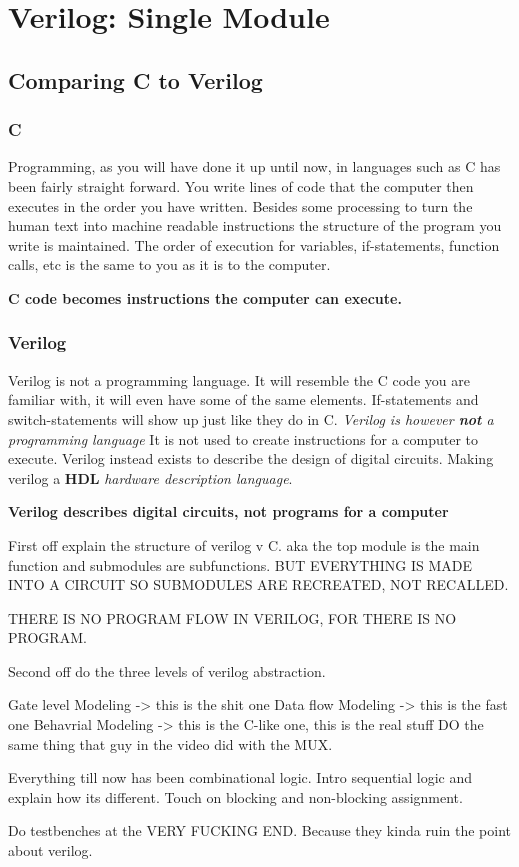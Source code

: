 \documentclass[12pt, a4paper, oneside]{memoir}
\newcommand{\attention}[1]{\begin{center}\colorbox{attention}{\textbf{#1}}\end{center}}
\begin{document}
\chapter{Verilog: Single Module} 
\section{Comparing C to Verilog}
\subsection*{C}
Programming, as you will have done it up until now, in languages such as C has been fairly straight forward.
You write lines of code that the computer then executes in the order you have written. 
Besides some processing to turn the human text into machine readable instructions the structure of the program you write is maintained.
The order of execution for variables, if-statements, function calls, etc is the same to you as it is to the computer.
\attention{C code becomes instructions the computer can execute.}

\subsection*{Verilog}
Verilog is not a programming language. It will resemble the C code you are familiar with, it will even have some of the same elements. If-statements and switch-statements will show up just like they do in C.
\textit{Verilog is however \textbf{not} a programming language}
It is not used to create instructions for a computer to execute.
Verilog instead exists to describe the design of digital circuits.
Making verilog a \textbf{HDL} \textit{hardware description language}.
\attention{Verilog describes digital circuits, not programs for a computer}

First off explain the structure of verilog v C.
aka the top module is the main function and submodules are subfunctions.
BUT EVERYTHING IS MADE INTO A CIRCUIT SO SUBMODULES ARE RECREATED, NOT RECALLED.

THERE IS NO PROGRAM FLOW IN VERILOG, FOR THERE IS NO PROGRAM.

Second off do the three levels of verilog abstraction.

Gate level Modeling -> this is the shit one
Data flow Modeling -> this is the fast one
Behavrial Modeling -> this is the C-like one, this is the real stuff
DO the same thing that guy in the video did with the MUX.

Everything till now has been combinational logic. Intro sequential logic and explain how its different.
Touch on blocking and non-blocking assignment.

Do testbenches at the VERY FUCKING END. Because they kinda ruin the point about verilog.
\end{document}
